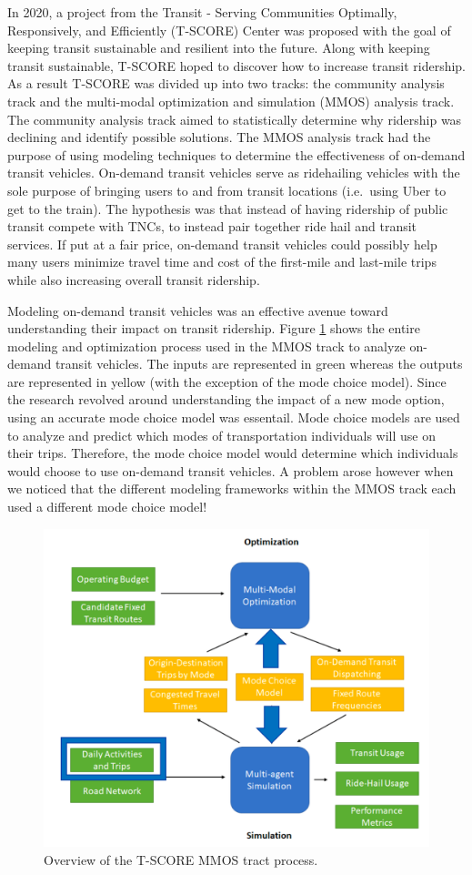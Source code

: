 \documentclass[3p, authoryear, review]{elsarticle} %
\begin{document}
In 2020, a project from the Transit - Serving Communities Optimally, Responsively, and Efficiently (T-SCORE) Center was proposed with the goal of keeping transit sustainable and resilient into the future. Along with keeping transit sustainable, T-SCORE hoped to discover how to increase transit ridership. As a result T-SCORE was divided up into two tracks: the community analysis track and the multi-modal optimization and simulation (MMOS) analysis track. The community analysis track aimed to statistically determine why ridership was declining and identify possible solutions. The MMOS analysis track had the purpose of using modeling techniques to determine the effectiveness of on-demand transit vehicles. On-demand transit vehicles serve as ridehailing vehicles with the sole purpose of bringing users to and from transit locations (i.e.~using Uber to get to the train). The hypothesis was that instead of having ridership of public transit compete with TNCs, to instead pair together ride hail and transit services. If put at a fair price, on-demand transit vehicles could possibly help many users minimize travel time and cost of the first-mile and last-mile trips while also increasing overall transit ridership.

Modeling on-demand transit vehicles was an effective avenue toward understanding their impact on transit ridership. Figure \ref{fig:mmos} shows the entire modeling and optimization process used in the MMOS track to analyze on-demand transit vehicles. The inputs are represented in green whereas the outputs are represented in yellow (with the exception of the mode choice model). Since the research revolved around understanding the impact of a new mode option, using an accurate mode choice model was essentail. Mode choice models are used to analyze and predict which modes of transportation individuals will use on their trips. Therefore, the mode choice model would determine which individuals would choose to use on-demand transit vehicles. A problem arose however when we noticed that the different modeling frameworks within the MMOS track each used a different mode choice model!

\begin{figure}

{\centering \includegraphics[width=0.75\linewidth]{pics/mmos_mode} 

}

\caption{Overview of the T-SCORE MMOS tract process.}\label{fig:mmos}
\end{figure}
\end{document}
